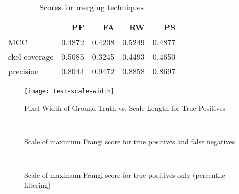 \begin{table}[p]\centering
  \begin{tabular}{l|rrrr}
    {} &        PF &        FA &        RW &        PS \\
    \hline
    MCC           &  0.4872 &  0.4208 &  0.5249 &  0.4877 \\
    skel coverage &  0.5085 &  0.3245 &  0.4493 &  0.4650 \\
    precision     &  0.8044 &  0.9472 &  0.8858 &  0.8697 \\
  \end{tabular}
\caption{Scores for merging techniques}
\end{table}

\begin{figure}[p]
  \texttt{[image: test-scale-width]}
  \caption{Pixel Width of Ground Truth vs. Scale Length for True Positives}
\end{figure}

\begin{figure}[p]\centering
  \\[-0.5cm]
  \caption{Scale of maximum Frangi score for true positives and false negatives}
\end{figure}

\begin{figure}[p]\centering
  \\[-0.5cm]
  \caption{Scale of maximum Frangi score for true positives only (percentile filtering)}
\end{figure}
